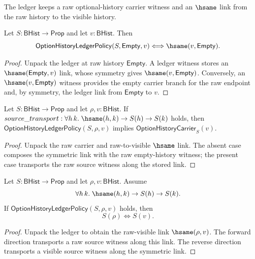 \begin{definition}
\label{def:option-ledger-policy}
The ledger keeps a raw optional-history carrier witness and an $\hsame$ link from the raw history to the visible history.
\end{definition}

\begin{theorem}
\label{thm:option-history-ledger-policy-empty-raw-iff}
Let $S:\mathsf{BHist}\to\mathsf{Prop}$ and let $v:\mathsf{BHist}$. Then
$$
\mathsf{OptionHistoryLedgerPolicy}(S,\mathsf{Empty},v)
\Longleftrightarrow
\hsame(v,\mathsf{Empty}).
$$
\end{theorem}
\begin{proof}
Unpack the ledger at raw history $\mathsf{Empty}$. A ledger witness stores an
$\hsame(\mathsf{Empty},v)$ link, whose symmetry gives
$\hsame(v,\mathsf{Empty})$. Conversely, an $\hsame(v,\mathsf{Empty})$ witness
provides the empty carrier branch for the raw endpoint and, by symmetry, the
ledger link from $\mathsf{Empty}$ to $v$.
\end{proof}

\begin{theorem}
\label{thm:option-ledger-policy-visible-carrier}
Let $S:\mathsf{BHist}\to\mathsf{Prop}$ and let $\rho,v:\mathsf{BHist}$. If
$source\_transport : \forall h\,k.\;\hsame(h,k)\to S(h)\to S(k)$ holds, then
$\mathsf{OptionHistoryLedgerPolicy}(S,\rho,v)$ implies
$\mathsf{OptionHistoryCarrier}_S(v)$.
\end{theorem}
\begin{proof}
Unpack the raw carrier and raw-to-visible $\hsame$ link. The absent case composes the symmetric link with the raw empty-history witness; the present case transports the raw source witness along the stored link.
\end{proof}

\begin{theorem}
\label{thm:option-history-ledger-policy-source-visible-iff}
Let $S:\mathsf{BHist}\to\mathsf{Prop}$ and let
$\rho,v:\mathsf{BHist}$. Assume
$$
  \forall h\,k.\;\hsame(h,k)\to S(h)\to S(k).
$$
If $\mathsf{OptionHistoryLedgerPolicy}(S,\rho,v)$ holds, then
$$
S(\rho)\Longleftrightarrow S(v).
$$
\end{theorem}
\begin{proof}
Unpack the ledger to obtain the raw-visible link $\hsame(\rho,v)$. The forward
direction transports a raw source witness along this link. The reverse
direction transports a visible source witness along the symmetric link.
\end{proof}

